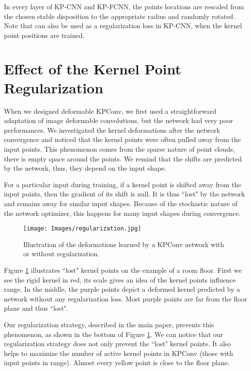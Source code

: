 \documentclass[10pt,twocolumn,letterpaper]{article}
\begin{document}
In every layer of KP-CNN and KP-FCNN, the points locations are rescaled from the chosen stable disposition to the appropriate radius and randomly rotated. Note that  can also be used as a regularization loss in KP-CNN, when the kernel point positions are trained.





\section{Effect of the Kernel Point Regularization}
\label{sec:C}

When we designed deformable KPConv, we first used a straightforward adaptation of image deformable convolutions, but the network had very poor performances. We investigated the kernel deformations after the network convergence and noticed that the kernel points were often pulled away from the input points. This phenomenon comes from the sparse nature of point clouds, there is empty space around the points. We remind that the shifts are predicted by the network, thus, they depend on the input shape. 

For a particular input during training, if a kernel point is shifted away from the input points, then the gradient of its shift  is null. It is thus ``lost" by the network and remains away for similar input shapes. Because of the stochastic nature of the network optimizer, this happens for many input shapes during convergence. 

\begin{figure}[b]
    \centering
    \texttt{[image: Images/regularization.jpg]}
    \vspace{1ex}
    \caption{Illustration of the deformations learned by a KPConv network with or without regularization.}
    \label{fig_regu}
\end{figure}


Figure \ref{fig_regu} illustrates ``lost" kernel points on the example of a room floor. First we see the rigid kernel in red, its scale gives an idea of the kernel points influence range. In the middle, the purple points depict a deformed kernel predicted by a network without any regularization loss. Most purple points are far from the floor plane and thus ``lost". 

Our regularization strategy, described in the main paper, prevents this phenomenon, as shown in the bottom of Figure \ref{fig_regu}. We can notice that our regularization strategy does not only prevent the ``lost" kernel points. It also helps to maximize the number of active kernel points in KPConv (those with input points in range). Almost every yellow point is close to the floor plane. 
\end{document}
